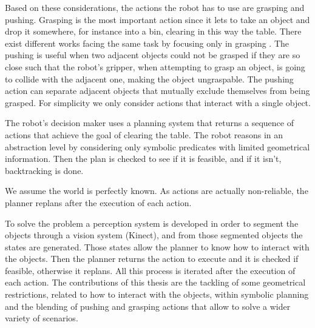 Based on these considerations, the actions the robot has to use are grasping and pushing.
Grasping is the most important action since it lets to take an object and drop it somewhere, for instance into a bin, clearing in this way the table. There exist different works facing the same task by focusing only in grasping \citep{haf,AGILE}. The pushing is useful when two adjacent objects could not be grasped if they are so close such that the robot's gripper, when attempting to grasp an object, is going to collide with the adjacent one, making the object ungraspable. The pushing action can separate adjacent objects that mutually exclude themselves from being grasped. 
For simplicity we only consider actions that interact with a single object.%

The robot's decision maker uses a planning system that returns a sequence of actions that achieve the goal of clearing the table. 
The robot reasons in an abstraction level by considering only symbolic predicates with limited geometrical information. Then the plan is checked to see if it is feasible, and if it isn't, backtracking is done.

We assume the world is perfectly known. As actions are actually non-reliable, the planner replans after the execution of each action.  

To solve the problem a perception system is developed in order to segment the objects through a vision system (Kinect), and from those segmented objects the states are generated. Those states allow the planner to know how to interact with the objects. Then the planner returns the action to execute and it is checked if feasible, otherwise it replans. All this process is iterated after the execution of each action. The contributions of this thesis are the tackling of some geometrical restrictions, related to how to interact with the objects, within symbolic planning and the blending of pushing and grasping actions that allow to solve a wider variety of scenarios. 

